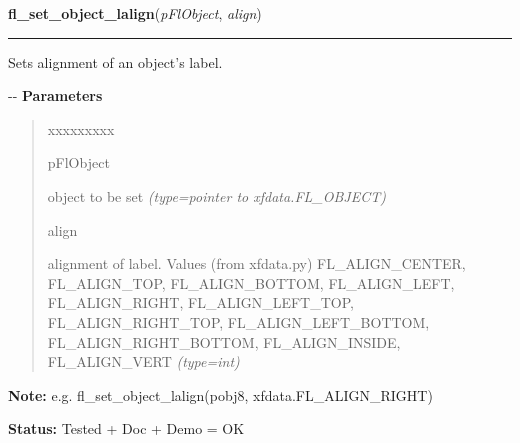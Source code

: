 \hspace{.8\funcindent}\begin{boxedminipage}{\funcwidth}

    \raggedright \textbf{fl\_set\_object\_lalign}(\textit{pFlObject}, \textit{align})

    \vspace{-1.5ex}

    \rule{\textwidth}{0.5\fboxrule}
\setlength{\parskip}{2ex}

Sets alignment of an object's label.

-{}-
\setlength{\parskip}{1ex}
      \textbf{Parameters}
      \vspace{-1ex}

      \begin{quote}
        \begin{Ventry}{xxxxxxxxx}

          \item[pFlObject]


object to be set
            {\it (type=pointer to xfdata.FL\_OBJECT)}

          \item[align]


alignment of label. Values (from xfdata.py) FL\_ALIGN\_CENTER,
FL\_ALIGN\_TOP, FL\_ALIGN\_BOTTOM, FL\_ALIGN\_LEFT, FL\_ALIGN\_RIGHT,
FL\_ALIGN\_LEFT\_TOP, FL\_ALIGN\_RIGHT\_TOP, FL\_ALIGN\_LEFT\_BOTTOM,
FL\_ALIGN\_RIGHT\_BOTTOM, FL\_ALIGN\_INSIDE, FL\_ALIGN\_VERT
            {\it (type=int)}

        \end{Ventry}

      \end{quote}

\textbf{Note:} 
e.g. fl\_set\_object\_lalign(pobj8, xfdata.FL\_ALIGN\_RIGHT)


\textbf{Status:} 
Tested + Doc + Demo = OK


    \end{boxedminipage}

    \label{xformslib:flbasic:fl_get_object_lalign}

    \vspace{0.5ex}


